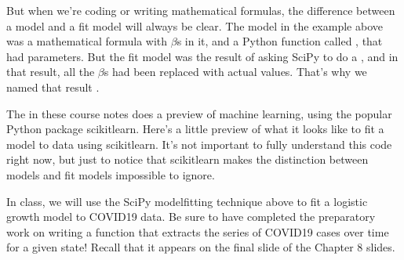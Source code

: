 \documentclass[letterpaper,10pt,english]{jupyterBook}
\begin{document}
\sphinxAtStartPar
But when we’re coding or writing mathematical formulas, the difference between a model and a fit model will always be clear.  The model in the example above was a mathematical formula with \(\beta\)s in it, and a Python function called , that had  parameters.  But the fit model was the result of asking SciPy to do a , and in that result, all the \(\beta\)s had been replaced with actual values.  That’s why we named that result .

\sphinxAtStartPar
The {\hyperref[\detokenize{chapter-17-machine-learning::doc}]{}} in these course notes does a preview of machine learning, using the popular Python package scikit\sphinxhyphen{}learn.  Here’s a little preview of what it looks like to fit a model to data using scikit\sphinxhyphen{}learn.  It’s not important to fully understand this code right now, but just to notice that scikit\sphinxhyphen{}learn makes the distinction between models and fit models impossible to ignore.

\begin{sphinxVerbatim}[commandchars=\\\{\}]
   
  

 \PYG{p}{[}\PYG{p}{]} \PYG{p}{[}\PYG{p}{]} 
\end{sphinxVerbatim}

\sphinxAtStartPar
In class, we will use the SciPy model\sphinxhyphen{}fitting technique above to fit a logistic growth model to COVID\sphinxhyphen{}19 data.  Be sure to have completed the preparatory work on writing a function that extracts the series of COVID\sphinxhyphen{}19 cases over time for a given state!  Recall that it appears on the final slide of the Chapter 8 slides.
\end{document}
